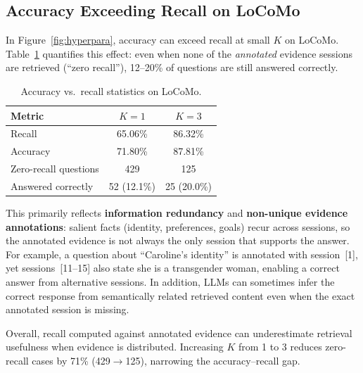 \subsection{Accuracy Exceeding Recall on LoCoMo}
\label{sec:acc_vs_recall}

In Figure~\ref{fig:hyperpara}, accuracy can exceed recall at small $K$ on LoCoMo. Table~\ref{tab:acc_recall} quantifies this effect: even when none of the \emph{annotated} evidence sessions are retrieved (``zero recall''), 12--20\% of questions are still answered correctly.

\begin{table}[h]
\centering
\small
\caption{Accuracy vs.\ recall statistics on LoCoMo.}
\label{tab:acc_recall}
\begin{tabular}{lcc}
\toprule
\textbf{Metric} & $K{=}1$ & $K{=}3$ \\
\midrule
Recall & 65.06\% & 86.32\% \\
Accuracy & 71.80\% & 87.81\% \\
Zero-recall questions & 429 & 125 \\
\hspace{0.8em}Answered correctly & 52 (12.1\%) & 25 (20.0\%) \\
\bottomrule
\end{tabular}
\end{table}

This primarily reflects \textbf{information redundancy} and \textbf{non-unique evidence annotations}: salient facts (identity, preferences, goals) recur across sessions, so the annotated evidence is not always the only session that supports the answer. For example, a question about ``Caroline's identity'' is annotated with session~[1], yet sessions~[11--15] also state she is a transgender woman, enabling a correct answer from alternative sessions. In addition, LLMs can sometimes infer the correct response from semantically related retrieved content even when the exact annotated session is missing.

Overall, recall computed against annotated evidence can underestimate retrieval usefulness when evidence is distributed. Increasing $K$ from 1 to 3 reduces zero-recall cases by 71\% (429$\rightarrow$125), narrowing the accuracy--recall gap.

